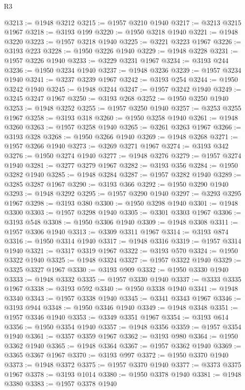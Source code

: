 \begin{lexlean}{R3}
\begin{coremodule}
@3213 := @1948 @3212
@3215 := @1957 @3210 @1940
@3217 := @3213 @3215 @1967
@3218 := @3193 @199
@3220 := @1950 @3218 @1940
@3221 := @1948 @3220
@3223 := @1957 @3218 @1940
@3225 := @3221 @3223 @1967
@3226 := @3193 @223
@3228 := @1950 @3226 @1940
@3229 := @1948 @3228
@3231 := @1957 @3226 @1940
@3233 := @3229 @3231 @1967
@3234 := @3193 @244
@3236 := @1950 @3234 @1940
@3237 := @1948 @3236
@3239 := @1957 @3234 @1940
@3241 := @3237 @3239 @1967
@3242 := @3193 @254
@3244 := @1950 @3242 @1940
@3245 := @1948 @3244
@3247 := @1957 @3242 @1940
@3249 := @3245 @3247 @1967
@3250 := @3193 @268
@3252 := @1950 @3250 @1940
@3253 := @1948 @3252
@3255 := @1957 @3250 @1940
@3257 := @3253 @3255 @1967
@3258 := @3193 @318
@3260 := @1950 @3258 @1940
@3261 := @1948 @3260
@3263 := @1957 @3258 @1940
@3265 := @3261 @3263 @1967
@3266 := @3193 @328
@3268 := @1950 @3266 @1940
@3269 := @1948 @3268
@3271 := @1957 @3266 @1940
@3273 := @3269 @3271 @1967
@3274 := @3193 @342
@3276 := @1950 @3274 @1940
@3277 := @1948 @3276
@3279 := @1957 @3274 @1940
@3281 := @3277 @3279 @1967
@3282 := @3193 @356
@3284 := @1950 @3282 @1940
@3285 := @1948 @3284
@3287 := @1957 @3282 @1940
@3289 := @3285 @3287 @1967
@3290 := @3193 @366
@3292 := @1950 @3290 @1940
@3293 := @1948 @3292
@3295 := @1957 @3290 @1940
@3297 := @3293 @3295 @1967
@3298 := @3193 @380
@3300 := @1950 @3298 @1940
@3301 := @1948 @3300
@3303 := @1957 @3298 @1940
@3305 := @3301 @3303 @1967
@3306 := @3193 @548
@3308 := @1950 @3306 @1940
@3309 := @1948 @3308
@3311 := @1957 @3306 @1940
@3313 := @3309 @3311 @1967
@3314 := @3193 @874
@3316 := @1950 @3314 @1940
@3317 := @1948 @3316
@3319 := @1957 @3314 @1940
@3321 := @3317 @3319 @1967
@3322 := @3193 @570
@3324 := @1950 @3322 @1940
@3325 := @1948 @3324
@3327 := @1957 @3322 @1940
@3329 := @3325 @3327 @1967
@3330 := @3193 @909
@3332 := @1950 @3330 @1940
@3333 := @1948 @3332
@3335 := @1957 @3330 @1940
@3337 := @3333 @3335 @1967
@3338 := @3193 @592
@3340 := @1950 @3338 @1940
@3341 := @1948 @3340
@3343 := @1957 @3338 @1940
@3345 := @3341 @3343 @1967
@3346 := @3193 @944
@3348 := @1950 @3346 @1940
@3349 := @1948 @3348
@3351 := @1957 @3346 @1940
@3353 := @3349 @3351 @1967
@3354 := @3193 @614
@3356 := @1950 @3354 @1940
@3357 := @1948 @3356
@3359 := @1957 @3354 @1940
@3361 := @3357 @3359 @1967
@3362 := @3193 @980
@3364 := @1950 @3362 @1940
@3365 := @1948 @3364
@3367 := @1957 @3362 @1940
@3369 := @3365 @3367 @1967
@3370 := @3193 @997
@3372 := @1950 @3370 @1940
@3373 := @1948 @3372
@3375 := @1957 @3370 @1940
@3377 := @3373 @3375 @1967
@3378 := @3193 @1014
@3380 := @1950 @3378 @1940
@3381 := @1948 @3380
@3383 := @1957 @3378 @1940

\end{coremodule}
\end{lexlean}
